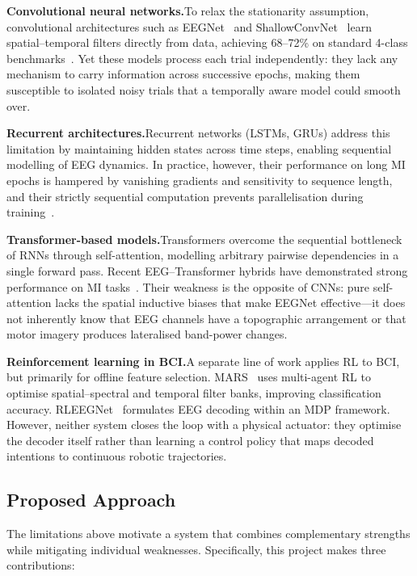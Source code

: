 \documentclass[12pt, a4paper]{article}
\begin{document}
\textbf{Convolutional neural networks.}\quad To relax the stationarity assumption, convolutional architectures such as EEGNet~\cite{lawhern2018eegnet} and ShallowConvNet~\cite{schirrmeister2017deep} learn spatial--temporal filters directly from data, achieving 68--72\% on standard 4-class benchmarks~\cite{hameed2025enhancing}. Yet these models process each trial independently: they lack any mechanism to carry information across successive epochs, making them susceptible to isolated noisy trials that a temporally aware model could smooth over.

\textbf{Recurrent architectures.}\quad Recurrent networks (LSTMs, GRUs) address this limitation by maintaining hidden states across time steps, enabling sequential modelling of EEG dynamics. In practice, however, their performance on long MI epochs is hampered by vanishing gradients and sensitivity to sequence length, and their strictly sequential computation prevents parallelisation during training~\cite{vaswani2017attention}.

\textbf{Transformer-based models.}\quad Transformers overcome the sequential bottleneck of RNNs through self-attention, modelling arbitrary pairwise dependencies in a single forward pass. Recent EEG--Transformer hybrids have demonstrated strong performance on MI tasks~\cite{song2022eeg}. Their weakness is the opposite of CNNs: pure self-attention lacks the spatial inductive biases that make EEGNet effective---it does not inherently know that EEG channels have a topographic arrangement or that motor imagery produces lateralised band-power changes.

\textbf{Reinforcement learning in BCI.}\quad A separate line of work applies RL to BCI, but primarily for offline feature selection. MARS~\cite{shin2024mars} uses multi-agent RL to optimise spatial--spectral and temporal filter banks, improving classification accuracy. RLEEGNet~\cite{nallani2024rleegnet} formulates EEG decoding within an MDP framework. However, neither system closes the loop with a physical actuator: they optimise the decoder itself rather than learning a control policy that maps decoded intentions to continuous robotic trajectories.

\subsection{Proposed Approach}

The limitations above motivate a system that combines complementary strengths while mitigating individual weaknesses. Specifically, this project makes three contributions:
\end{document}
